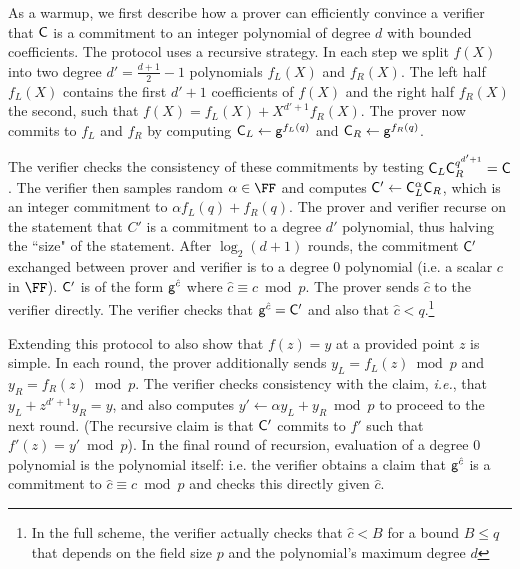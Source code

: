 As a warmup, we first describe how a prover can efficiently convince a verifier that $\mathsf{C}$ is a commitment to an integer polynomial of degree $d$ with bounded coefficients. The protocol uses a recursive strategy. 
In each step we split $f(X)$ into two degree $d'=\frac{d+1}{2}-1$ polynomials $f_L(X)$ and $f_R(X)$. 
The left half $f_L(X)$ contains the first $d'+1$ coefficients of $f(X)$ and the right half $f_R(X)$ the second, such that $f(X)=f_L(X)+X^{d'+1}f_R(X)$. The prover now commits to $f_L$ and $f_R$ by computing $\mathsf{C}_L\gets \mathsf{g}^{f_L(q)}$ and $\mathsf{C}_R\gets \mathsf{g}^{f_R(q)}$.
\begin{comment}
In our running example, $f_L(X)=4X+1$ and $f_R(X)=2X+3$. 
\end{comment} 
The verifier checks the consistency of these commitments by testing $\mathsf{C}_L\mathsf{C}_R^{q^{d'+1}}=\mathsf{C}$. The verifier then samples random  $\alpha \in \FF$ and computes $\mathsf{C}'\gets \mathsf{C}_L^{\alpha}\mathsf{C}_R$, which is an integer commitment to $\alpha f_L(q) + f_R(q)$. The prover and verifier recurse on the statement that $C'$ is a commitment to a degree $d'$ polynomial, thus halving the ``size" of the statement. %
After $\log_2(d+1)$ rounds, the commitment $\mathsf{C}'$ exchanged between prover and verifier is to a degree $0$ polynomial (i.e. a scalar $c$ in $\FF$). $\mathsf{C}'$ is of the form $\mathsf{g}^{\hat{c}}$ where $\hat{c} \equiv c \bmod p$. 
The prover sends $\hat{c}$ to the verifier directly. 
The verifier checks that $\mathsf{g}^{\hat{c}} = \mathsf{C}'$ and also that $\hat{c} < q$.\footnote{In the full scheme, the verifier actually checks that $\hat{c} < B$ for a bound $B \leq q$ that depends on the field size $p$ and the polynomial's maximum degree $d$} 

Extending this protocol to also show that $f(z) = y$ at a provided point $z$ is simple. 
In each round, the prover additionally sends $y_L=f_L(z)\bmod p$ and $y_R=f_R(z)\bmod p$. The verifier checks consistency with the claim, \emph{i.e.}, that $y_L+z^{d'+1}y_R=y$, and also computes $y' \leftarrow \alpha y_L+y_R\bmod p$ to proceed to the next round. (The recursive claim is that $\mathsf{C}'$ commits to $f'$ such that $f'(z) = y' \bmod p$). In the final round of recursion, evaluation of a degree $0$ polynomial is the polynomial itself: i.e. the verifier obtains a claim that $\mathsf{g}^{\hat{c}}$ is a commitment to $\hat{c} \equiv c \bmod p$ and checks this directly given $\hat{c}$. 

